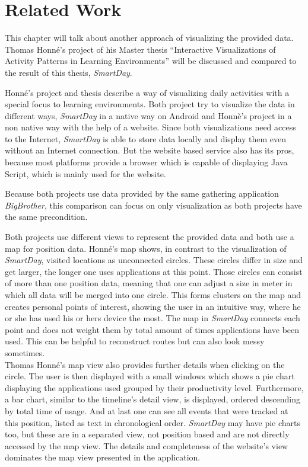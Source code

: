 \chapter{Related Work}
\label{cha:related_work}

This chapter will talk about another approach of visualizing the provided data. Thomas Honné's project of his Master thesis ``Interactive Visualizations of Activity Patterns in Learning Environments'' \cite{thomasthesis} will be discussed and compared to the result of this thesis, \emph{SmartDay}.

Honné's  project and thesis describe a way of visualizing daily activities with a special focus to learning environments. Both project try to visualize the data in different ways, \emph{SmartDay} in a native way on Android and Honnè's project in a non native way with the help of a website. Since both visualizations need access to the Internet, \emph{SmartDay} is able to store data locally and display them even without an Internet connection. But the website based service also has its pros, because most platforms provide a browser which is capable of displaying Java Script, which is mainly used for the website.

Because both projects use data provided by the same gathering application \emph{BigBrother}, this comparison can focus on only visualization as both projects have the same precondition.

Both  projects use different views to represent the provided data and both use a map for position data. Honné's map shows, in contrast to the visualization of \emph{SmartDay}, visited locations as unconnected circles. These circles differ in size and get larger, the longer one uses applications at this point. Those circles can consist of more than one position data, meaning that one can adjust a size in meter in which all data will be merged into one circle. This forms clusters on the map and creates personal points of interest, showing the user in an intuitive way, where he or she has used his or hers device the most. The map in \emph{SmartDay} connects each point and does not weight them by total amount of times applications have been used. This can be helpful to reconstruct routes but can also look messy sometimes.\\
Thomas Honné's map view also provides further details when clicking on the circle. The user is then displayed with a small windows which shows a pie chart displaying the applications used grouped by their productivity level. Furthermore, a bar chart,  similar to the timeline's detail view, is displayed, ordered descending by total time of usage. And at last one can see all events that were tracked at this position, listed as text in chronological order. \emph{SmartDay} may have pie charts too, but these are in a separated view, not position based and are not directly accessed by the map view. The details and completeness of the website's view dominates the map view presented in the application.

